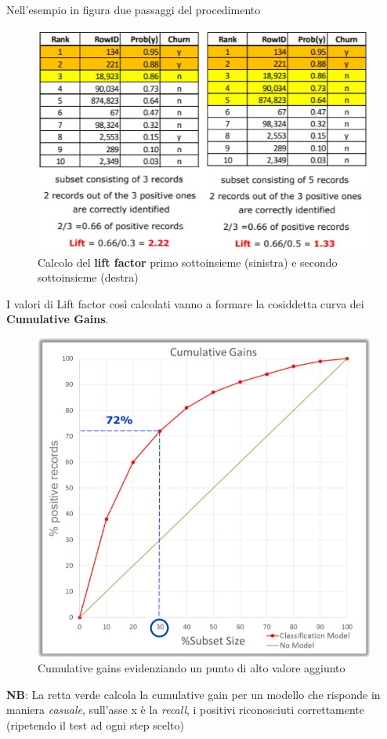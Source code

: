 Nell'esempio in figura due passaggi del procedimento 
\begin{figure}[H]
	\centering
	\includegraphics[height=0.6 \linewidth]{classification/pict/liftFactor.png}
	\caption{Calcolo del \textbf{lift factor} primo sottoinsieme (sinistra) e secondo sottoinsieme (destra)}
\end{figure}

\begin{defn}
	I valori di Lift factor così calcolati vanno a formare la cosiddetta curva dei \textbf{Cumulative Gains}.
\end{defn}
\begin{figure}[H]
	\centering
	\includegraphics[height=0.6 \linewidth]{classification/pict/cumulative_gains.png}
	\caption{Cumulative gains evidenziando un punto di alto valore aggiunto}
\end{figure}

\textbf{NB}: La retta {\color{ao(english)}verde} calcola la cumulative gain per un modello che risponde in maniera \textit{casuale}, sull'asse x è la \textit{recall}, i positivi riconosciuti correttamente (ripetendo il test ad ogni step scelto)

